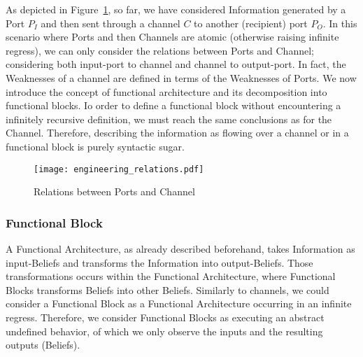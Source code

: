 As depicted in Figure~\ref{fig:atom}, so far, we have considered Information
generated by a Port $P_I$ and then sent through a channel $C$ to another
(recipient) port $P_O$. In this scenario where Ports and then Channels are
atomic (otherwise raising infinite regress), we can only  consider the
relations between Ports and Channel; considering both input-port to channel and
channel to output-port. In fact, the Weaknesses of a channel are defined in terms
of the Weaknesses of Ports. We now introduce the concept of
functional architecture and its decomposition into functional blocks. 
Io order to define a functional block without encountering a infinitely recursive definition,
we must reach the same conclusions as for the Channel. Therefore, describing
the information as flowing over a channel or in a functional block is purely
syntactic sugar.

\begin{figure}[t]
	\centering
	\texttt{[image: engineering\_relations.pdf]}
	\caption{Relations between Ports and Channel}
	\label{fig:atom}
\end{figure}

\subsubsection{Functional Block}
A Functional Architecture, as already described beforehand, takes Information as input-Beliefs
and transforms the Information into output-Beliefs. Those transformations 
occurs within the Functional Architecture, where Functional Blocks transforms Beliefs into 
other Beliefs. Similarly to channels, we could consider a Functional Block as a Functional Architecture
occurring in an infinite regress. Therefore, we consider Functional Blocks as 
executing an abstract undefined behavior, of which we only observe the
inputs and the resulting outputs (Beliefs).

